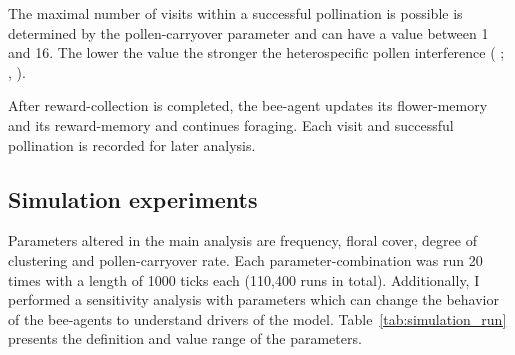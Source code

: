 The maximal number of visits within a successful pollination is possible is determined by the pollen-carryover parameter and can have a value between 1 and 16. The lower the value the stronger the heterospecific pollen interference ( \citealt{campbell1986predicting}; \citealt{benadi2012population},  \citealt{montgomery2009pollen}).

After reward-collection is completed, the bee-agent updates its flower-memory and its reward-memory and continues foraging. Each visit and successful pollination is recorded for later analysis. 


\subsection*{Simulation experiments}

Parameters altered in the main analysis are frequency, floral cover, degree of clustering and pollen-carryover rate. Each parameter-combination was run 20 times with a length of 1000 ticks each (110,400 runs in total). Additionally, I performed a sensitivity analysis with parameters which can change the behavior of the bee-agents to understand drivers of the model. Table~\ref{tab:simulation_run} presents the definition and value range of the parameters.
 


